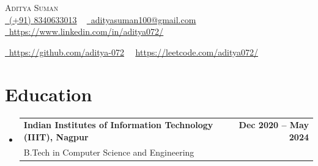 \documentclass[letterpaper,11pt]{article}
\makeatletter
\newcommand{\resumeSubheading}[4]{
  \vspace{-2pt}\item
    \begin{tabular*}{1.0\textwidth}[t]{l@{\extracolsep{\fill}}r}
      \textbf{#1} & \textbf{\small #2} \\
      {\small#3} & {\small #4} \\
    \end{tabular*}\vspace{-7pt}
}
\newcommand{\resumeSubHeadingListStart}{\begin{itemize}[leftmargin=0.0in, label={}]}
\newcommand{\resumeSubHeadingListEnd}{\end{itemize}}
\makeatother
\begin{document}
\begin{center}
    {\Huge \scshape Aditya Suman} \\ \vspace{5pt}
    \vspace{5pt}
    \small
    \href{tel:+918340633013}{\raisebox{-0.25\height}\faPhone\ {\color{black}\underline{(+91) 8340633013}}}  ~
    \href{mailto:adityasuman100@gmail.com}{\raisebox{-0.25\height}\faEnvelope\  {\color{black}\underline{adityasuman100@gmail.com}}} ~
    \href{https://www.linkedin.com/in/aditya072/}{\raisebox{-0.25\height}\faLinkedin\ {\color{black}\underline{https://www.linkedin.com/in/aditya072/}}}  ~
    \\ \vspace{5pt}

    \href{https://github.com/aditya-072}{\raisebox{-0.25\height}\faGithub\ {\color{black}\underline{https://github.com/aditya-072}}}~~
    \href{https://leetcode.com/aditya072/}{
        {\color{black}\underline{https://leetcode.com/aditya072/}}} ~~
    \vspace{2.5pt}

\end{center}

\section{Education}
\resumeSubHeadingListStart
\resumeSubheading
{Indian Institutes of Information Technology (IIIT), Nagpur}{Dec 2020 -- May 2024}
{B.Tech in Computer Science and Engineering}{}
\vspace{-1.5pt}

\resumeSubHeadingListEnd
\vspace{-5.0mm}
\end{document}
